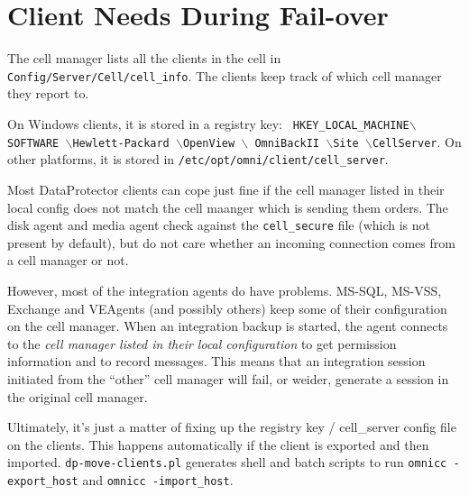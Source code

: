 \documentclass{article}
\begin{document}
\section*{Client Needs During Fail-over}

The cell manager lists all the clients in the cell in {\tt Config/Server/Cell/cell\_info}. The clients keep track of which cell manager they report to.

On Windows clients, it is stored in a registry key:
{\tt 
  HKEY\_LOCAL\_MACHINE$\backslash$SOFTWARE $\backslash$Hewlett-Packard $\backslash$OpenView $\backslash$ OmniBackII $\backslash$Site $\backslash$CellServer}. On other platforms, it is stored in {\tt /etc/opt/omni/client/cell\_server}.

Most DataProtector clients can cope just fine if the cell manager listed in their local config does not match the cell maanger which is sending them orders. The disk agent and media agent check against the {\tt cell\_secure} file (which is not present by default), but do not care whether an incoming connection comes from a cell manager or not.

However, most of the integration agents do have problems. MS-SQL, MS-VSS, Exchange and VEAgents (and possibly others) keep some of their configuration on the cell manager. When an integration backup is started, the agent connects to the {\it cell manager listed in their local configuration} to get permission information and to record messages. This means that an integration session initiated from the ``other'' cell manager will fail, or weider, generate a session in the original cell manager.

Ultimately, it's just a matter of fixing up the registry key / cell\_server config file on the clients. This happens automatically if the client is exported and then imported. {\tt dp-move-clients.pl} generates shell and batch scripts to run {\tt omnicc -export\_host} and {\tt omnicc -import\_host}. 
\end{document}
